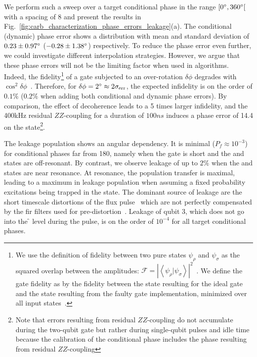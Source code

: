 We perform such a sweep over a target conditional phase in the range $[0^\circ, 360^\circ[$ with a spacing of 8\degree{} and present the results in Fig.~\ref{fig:carb_characterization_phase_errors_leakage}(a). The conditional (dynamic) phase error shows a distribution with mean and standard deviation of $0.23\pm0.97^\circ$ ($-0.28\pm1.38^\circ$) respectively. To reduce the phase error even further, we could investigate different interpolation strategies. However, we argue that these phase errors will not be the limiting factor when used in algorithms. Indeed, the fidelity\footnote{We use the  definition of fidelity between two pure states $\psi_{\rho}$ and $\psi_{\sigma}$ as the squared overlap between the amplitudes: $\mathcal{F} = \left|\left\langle\psi_{\rho} | \psi_{\sigma}\right\rangle\right|^{2}$~\cite{Jozsa1994FidelityStates}. We define the gate fidelity as by the fidelity between the state resulting for the ideal gate and the state resulting from the faulty gate implementation, minimized over all input
states~\cite{Reiner2018EffectsSystems}.} of a gate subjected to an over-rotation $\delta\phi$ degrades with $\cos^2{\delta\phi}$~\cite{Reiner2018EffectsSystems}. Therefore, for $\delta\phi = 2 ^\circ \approx 2\sigma_{\textrm{err}}$, the expected infidelity is on the order of $0.1\%$ ($0.2\%$ when adding both conditional and dynamic phase errors). By comparison, the effect of decoherence leads to a 5 times larger infidelity, and the 400\unit{kHz} residual $ZZ$-coupling for a duration of $100 \unit{ns}$ induces a phase error of 14.4\degree{} on the \oo{} state\footnote{Note that errors resulting from residual $ZZ$-coupling do not accumulate during the two-qubit gate but rather during single-qubit pulses and idle time because the calibration of the conditional phase includes the phase resulting from residual $ZZ$-coupling}. 

The leakage population shows an angular dependency. It is minimal ($P_f \approx 10^{-3}$) for conditional phases far from 180\degree, namely when the gate is short and the \oo{} and \tz{} states are off-resonant. By contrast, we observe leakage of up to $2\%$ when the \oo{} and \tz{} states are near resonance. At resonance, the population transfer is maximal, leading to a maximum in leakage population when assuming a fixed probability excitations being trapped in the \tz{} state. The dominant source of leakage are the short timescale distortions of the flux pulse~\cite{Rol2019Time-domainProcessor} which are not perfectly compensated by the \gls{fir} filters used for pre-distortion~\cite{Butscher2018ShapingFiltering}.  Leakage of qubit 3, which does not go into the \f{} level during the pulse, is on the order of $10^{-4}$ for all target conditional phases.

